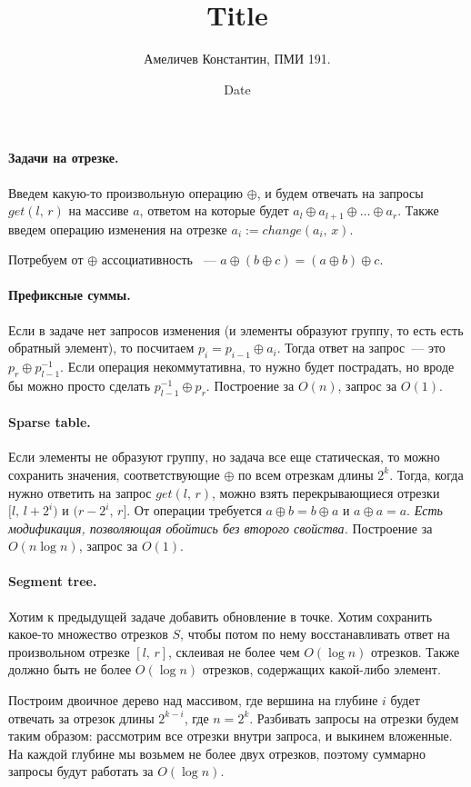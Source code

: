 \documentclass[12pt]{article}
\title{Title}
\author{Амеличев Константин, ПМИ 191.}
\date{Date}
\begin{document}
\paragraph{Задачи на отрезке.} Введем какую-то произвольную операцию $\oplus$, и будем отвечать на запросы $get(l,\,r)$ на массиве $a$, ответом на которые будет $a_l \oplus a_{l+1} \oplus \dots \oplus a_r$. Также введем операцию изменения на отрезке $a_i := change(a_i,\,x)$.

Потребуем от $\oplus$ ассоциативность ~--- $a \oplus (b \oplus c) = (a \oplus b) \oplus c$.

\paragraph{Префиксные суммы.} Если в задаче нет запросов изменения (и элементы образуют группу, то есть есть обратный элемент), то посчитаем $p_i = p_{i-1} \oplus a_i$. Тогда ответ на запрос~--- это $p_r \oplus p_{l-1}^{-1}$. Если операция некоммутативна, то нужно будет пострадать, но вроде бы можно просто сделать $p_{l-1}^{-1} \oplus p_r$. Построение за $O(n)$, запрос за $O(1)$.

\paragraph{Sparse table.} Если элементы не образуют группу, но задача все еще статическая, то можно сохранить значения, соответствующие $\oplus$ по всем отрезкам длины $2^k$. Тогда, когда нужно ответить на запрос $get(l,\,r)$, можно взять перекрывающиеся отрезки $[l,\,l + 2^i)$ и $(r - 2^i,\,r]$. От операции требуется $a \oplus b = b \oplus a$ и $a \oplus a = a$. \textit{Есть модификация, позволяющая обойтись без второго свойства.} Построение за $O(n \log n)$, запрос за $O(1)$. 

\paragraph{Segment tree.} Хотим к предыдущей задаче добавить обновление в точке. Хотим сохранить какое-то множество отрезков $S$, чтобы потом по нему восстанавливать ответ на произвольном отрезке $[l,\,r]$, склеивая не более чем $O(\log n)$ отрезков. Также должно быть не более $O(\log n)$ отрезков, содержащих какой-либо элемент.

Построим двоичное дерево над массивом, где вершина на глубине $i$ будет отвечать за отрезок длины $2^{k-i}$, где $n = 2^k$. Разбивать запросы на отрезки будем таким образом: рассмотрим все отрезки внутри запроса, и выкинем вложенные. На каждой глубине мы возьмем не более двух отрезков, поэтому суммарно запросы будут работать за $O(\log n)$.
\end{document}
